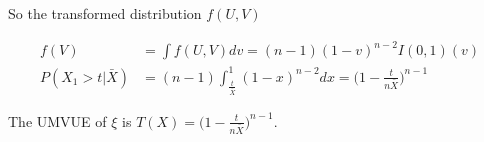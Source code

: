 \begin{Example}
So the transformed distribution $f(U, V)$

\begin{align*}
f(V) &= \int f(U, V) dv = (n-1) (1-v)^{n-2} I(0,1)(v) \\
P(X_1 > t | \bar{X}) &= (n-1) \int_{\frac{t}{\bar{X}}}^1 (1-x)^{n-2} dx = \Big( 1 - \frac{t}{n\bar{X}} \Big)^{n-1}
\end{align*}

The UMVUE of $\xi$ is $T(X) =  \Big( 1 - \frac{t}{n\bar{X}} \Big)^{n-1}$. 

\end{Example}
